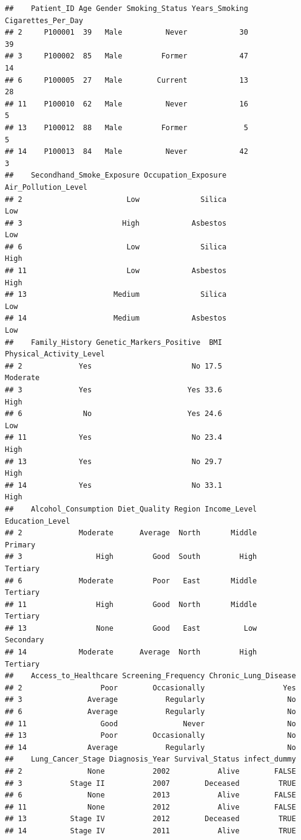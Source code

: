 \documentclass[
]{article}
\begin{document}
\begin{verbatim}
##    Patient_ID Age Gender Smoking_Status Years_Smoking Cigarettes_Per_Day
## 2     P100001  39   Male          Never            30                 39
## 3     P100002  85   Male         Former            47                 14
## 6     P100005  27   Male        Current            13                 28
## 11    P100010  62   Male          Never            16                  5
## 13    P100012  88   Male         Former             5                  5
## 14    P100013  84   Male          Never            42                  3
##    Secondhand_Smoke_Exposure Occupation_Exposure Air_Pollution_Level
## 2                        Low              Silica                 Low
## 3                       High            Asbestos                 Low
## 6                        Low              Silica                High
## 11                       Low            Asbestos                High
## 13                    Medium              Silica                 Low
## 14                    Medium            Asbestos                 Low
##    Family_History Genetic_Markers_Positive  BMI Physical_Activity_Level
## 2             Yes                       No 17.5                Moderate
## 3             Yes                      Yes 33.6                    High
## 6              No                      Yes 24.6                     Low
## 11            Yes                       No 23.4                    High
## 13            Yes                       No 29.7                    High
## 14            Yes                       No 33.1                    High
##    Alcohol_Consumption Diet_Quality Region Income_Level Education_Level
## 2             Moderate      Average  North       Middle         Primary
## 3                 High         Good  South         High        Tertiary
## 6             Moderate         Poor   East       Middle        Tertiary
## 11                High         Good  North       Middle        Tertiary
## 13                None         Good   East          Low       Secondary
## 14            Moderate      Average  North         High        Tertiary
##    Access_to_Healthcare Screening_Frequency Chronic_Lung_Disease
## 2                  Poor        Occasionally                  Yes
## 3               Average           Regularly                   No
## 6               Average           Regularly                   No
## 11                 Good               Never                   No
## 13                 Poor        Occasionally                   No
## 14              Average           Regularly                   No
##    Lung_Cancer_Stage Diagnosis_Year Survival_Status infect_dummy
## 2               None           2002           Alive        FALSE
## 3           Stage II           2007        Deceased         TRUE
## 6               None           2013           Alive        FALSE
## 11              None           2012           Alive        FALSE
## 13          Stage IV           2012        Deceased         TRUE
## 14          Stage IV           2011           Alive         TRUE
\end{verbatim}
\end{document}
